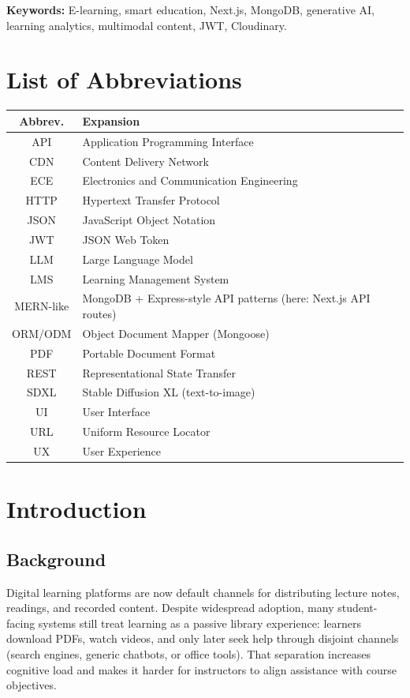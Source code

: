 \documentclass[a4paper,12pt,openany]{report}
\begin{document}
\vspace{0.5cm}
\noindent\textbf{Keywords:} E-learning, smart education, Next.js, MongoDB, generative AI, learning analytics, multimodal content, JWT, Cloudinary.

\clearpage

\tableofcontents
\clearpage

\chapter*{List of Abbreviations}
\begin{center}
\begin{tabular}{@{}cl@{}}
\toprule
\textbf{Abbrev.} & \textbf{Expansion} \\
\midrule
API & Application Programming Interface \\
CDN & Content Delivery Network \\
ECE & Electronics and Communication Engineering \\
HTTP & Hypertext Transfer Protocol \\
JSON & JavaScript Object Notation \\
JWT & JSON Web Token \\
LLM & Large Language Model \\
LMS & Learning Management System \\
MERN-like & MongoDB + Express-style API patterns (here: Next.js API routes) \\
ORM/ODM & Object Document Mapper (Mongoose) \\
PDF & Portable Document Format \\
REST & Representational State Transfer \\
SDXL & Stable Diffusion XL (text-to-image) \\
UI & User Interface \\
URL & Uniform Resource Locator \\
UX & User Experience \\
\bottomrule
\end{tabular}
\end{center}
\clearpage
{}
\setcounter{page}{1}

\chapter{Introduction}

\section{Background}
Digital learning platforms are now default channels for distributing lecture notes, readings, and recorded content. Despite widespread adoption, many student-facing systems still treat learning as a passive library experience: learners download PDFs, watch videos, and only later seek help through disjoint channels (search engines, generic chatbots, or office tools). That separation increases cognitive load and makes it harder for instructors to align assistance with course objectives.
\end{document}
